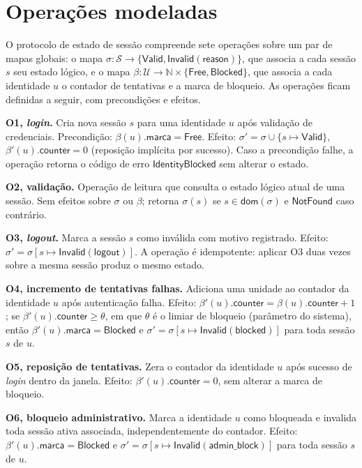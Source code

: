 \section*{Operações modeladas}
\label{sec-operacoes}

O protocolo de estado de sessão compreende sete operações sobre um par de mapas globais: o mapa $\sigma : \mathcal{S} \to \{\textsf{Valid}, \textsf{Invalid}(\textsf{reason})\}$, que associa a cada sessão $s$ seu estado lógico, e o mapa $\beta : \mathcal{U} \to \mathbb{N} \times \{\textsf{Free}, \textsf{Blocked}\}$, que associa a cada identidade $u$ o contador de tentativas e a marca de bloqueio.  As operações ficam definidas a seguir, com precondições e efeitos.

\textbf{O1, \emph{login}.} Cria nova sessão $s$ para uma identidade $u$ após validação de credenciais. Precondição: $\beta(u).\textsf{marca} = \textsf{Free}$. Efeito: $\sigma' = \sigma \cup \{s \mapsto \textsf{Valid}\}$, $\beta'(u).\textsf{counter} = 0$ (reposição implícita por sucesso). Caso a precondição falhe, a operação retorna o código de erro $\textsf{IdentityBlocked}$ sem alterar o estado. 

\textbf{O2, validação.} Operação de leitura que consulta o estado lógico atual de uma sessão. Sem efeitos sobre $\sigma$ ou $\beta$; retorna $\sigma(s)$ se $s \in \textsf{dom}(\sigma)$ e $\textsf{NotFound}$ caso contrário.

\textbf{O3, \emph{logout}.} Marca a sessão $s$ como inválida com motivo registrado. Efeito: $\sigma' = \sigma[s \mapsto \textsf{Invalid}(\textsf{logout})]$. A operação é idempotente: aplicar O3 duas vezes sobre a mesma sessão produz o mesmo estado.

\textbf{O4, incremento de tentativas falhas.} Adiciona uma unidade ao contador da identidade $u$ após autenticação falha. Efeito: $\beta'(u).\textsf{counter} = \beta(u).\textsf{counter} + 1$; se $\beta'(u).\textsf{counter} \ge \theta$, em que $\theta$ é o limiar de bloqueio (parâmetro do sistema), então $\beta'(u).\textsf{marca} = \textsf{Blocked}$ e $\sigma' = \sigma[s \mapsto \textsf{Invalid}(\textsf{blocked})]$ para toda sessão $s$ de $u$. 

\textbf{O5, reposição de tentativas.} Zera o contador da identidade $u$ após sucesso de \emph{login} dentro da janela. Efeito: $\beta'(u).\textsf{counter} = 0$, sem alterar a marca de bloqueio.

\textbf{O6, bloqueio administrativo.} Marca a identidade $u$ como bloqueada e invalida toda sessão ativa associada, independentemente do contador. Efeito: $\beta'(u).\textsf{marca} = \textsf{Blocked}$ e $\sigma' = \sigma[s \mapsto \textsf{Invalid}(\textsf{admin\_block})]$ para toda sessão $s$ de $u$.

